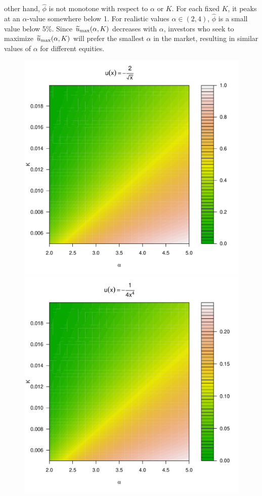 other hand, $\hat\phi$ is not monotone with respect to $\alpha$ or
$K$. For each fixed $K$, it peaks at an $\alpha$-value somewhere below
1. For realistic values $\alpha\in (2, 4)$, $\hat\phi$ is a
small value below 5\%.
Since $\widetilde u_{\rm max}(\alpha, K)$ decreases with
$\alpha$, investors who seek to maximize $\widetilde u_{\rm max}(\alpha, K)$
will prefer the smallest $\alpha$ in the market, resulting in similar
values of $\alpha$ for different equities.
\begin{figure}[htb!]
  \begin{minipage}{0.25\linewidth}
    \includegraphics[width=\textwidth]{phi_hat_pareto5e-1_A.pdf}    
  \end{minipage}\hfill
  \begin{minipage}{0.25\linewidth}
    \includegraphics[width=\textwidth]{phi_hat_pareto4_A.pdf}

\end{minipage}
\end{figure}
